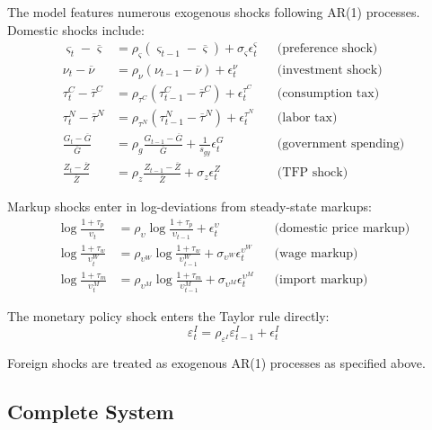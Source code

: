 \documentclass[12pt]{article}
\begin{document}
The model features numerous exogenous shocks following AR(1) processes. Domestic shocks include:
\begin{align}
\varsigma_t - \overline{\varsigma} &= \rho_\varsigma (\varsigma_{t-1} - \overline{\varsigma}) + \sigma_\varsigma \epsilon_t^\varsigma && \text{(preference shock)} \\
\nu_t - \overline{\nu} &= \rho_\nu (\nu_{t-1} - \overline{\nu}) + \epsilon_t^\nu && \text{(investment shock)} \\
\tau_t^C - \overline{\tau}^C &= \rho_{\tau^C} (\tau_{t-1}^C - \overline{\tau}^C) + \epsilon_t^{\tau^C} && \text{(consumption tax)} \\
\tau_t^N - \overline{\tau}^N &= \rho_{\tau^N} (\tau_{t-1}^N - \overline{\tau}^N) + \epsilon_t^{\tau^N} && \text{(labor tax)} \\
\frac{G_t - \overline{G}}{\overline{G}} &= \rho_g \frac{G_{t-1} - \overline{G}}{\overline{G}} + \frac{1}{s_{gy}} \epsilon_t^G && \text{(government spending)} \\
\frac{Z_t - \overline{Z}}{\overline{Z}} &= \rho_z \frac{Z_{t-1} - \overline{Z}}{\overline{Z}} + \sigma_z \epsilon_t^Z && \text{(TFP shock)}
\end{align}

Markup shocks enter in log-deviations from steady-state markups:
\begin{align}
\log \frac{1+\tau_p}{\upsilon_t} &= \rho_\upsilon \log \frac{1+\tau_p}{\upsilon_{t-1}} + \epsilon_t^\upsilon && \text{(domestic price markup)} \\
\log \frac{1+\tau_w}{\upsilon_t^W} &= \rho_{\upsilon^W} \log \frac{1+\tau_w}{\upsilon_{t-1}^W} + \sigma_{\upsilon^W} \epsilon_t^{\upsilon^W} && \text{(wage markup)} \\
\log \frac{1+\tau_m}{\upsilon_t^M} &= \rho_{\upsilon^M} \log \frac{1+\tau_m}{\upsilon_{t-1}^M} + \sigma_{\upsilon^M} \epsilon_t^{\upsilon^M} && \text{(import markup)}
\end{align}

The monetary policy shock enters the Taylor rule directly:
\begin{equation}
\varepsilon_t^I = \rho_{\varepsilon^I} \varepsilon_{t-1}^I + \epsilon_t^I
\end{equation}

Foreign shocks are treated as exogenous AR(1) processes as specified above.

\subsection{Complete System}
\end{document}
